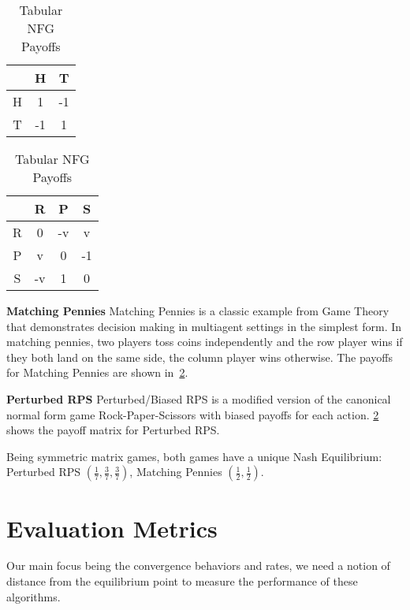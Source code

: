 \begin{table}
	\begin{subtable}[c]{0.5\textwidth}
	\centering
		\begin{tabular}{c|c c} 
			\text{ } & H & T \\ 
			\hline 
			H & 1 & -1\\ 
			T & -1 & 1 \\ 
		\end{tabular} 
	\end{subtable}
	\begin{subtable}[c]{0.5\textwidth}
		\centering
			\begin{tabular}{c|c c c} 
				\text{ } & R & P & S \\ 
				\hline 
				R & 0 & -v & v \\ 
				P & v & 0 & -1 \\ 
				S & -v & 1 & 0 \\
			\end{tabular} 
	\end{subtable}
	\caption{Tabular NFG Payoffs}
	\label{tab:payoffs}
\end{table}

\textbf{Matching Pennies} Matching
Pennies is a classic example from Game Theory that demonstrates decision making in multiagent
settings in the simplest form.
In matching pennies, two players toss coins independently and the row player wins if they both land
on the same side, the column player wins otherwise.
The payoffs for Matching Pennies are shown in~\ref{tab:payoffs}.

\textbf{Perturbed RPS}
Perturbed/Biased RPS is a modified version of the canonical normal form game Rock-Paper-Scissors
with biased payoffs for each action.
\ref{tab:payoffs} shows the payoff matrix for Perturbed RPS.

Being symmetric matrix games, both games have a unique Nash Equilibrium: Perturbed RPS
$(\frac{1}{7}, \frac{3}{7}, \frac{3}{7})$, Matching Pennies $(\frac{1}{2}, \frac{1}{2})$.

\section{Evaluation Metrics}
Our main focus being the convergence behaviors and rates, we need a notion of distance from the
equilibrium point to measure the performance of these algorithms.

